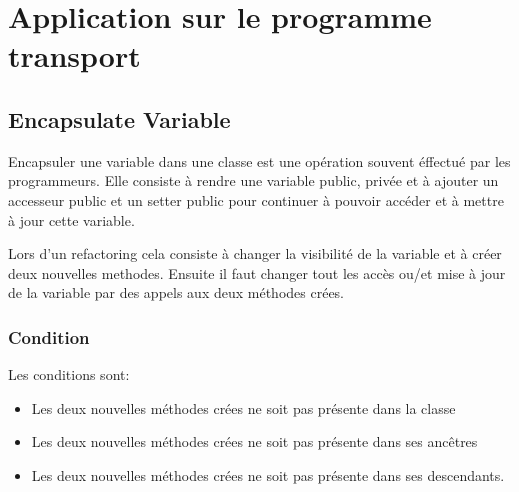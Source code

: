 \documentclass[a4paper, 12pt]{article}
\begin{document}
\section{Application sur le programme transport}

\subsection{Encapsulate Variable}

Encapsuler une variable dans une classe est une opération souvent éffectué par les programmeurs. 
Elle consiste à rendre une variable public, privée et à ajouter un accesseur public et un setter public pour continuer à pouvoir accéder et à mettre à jour cette variable.

Lors d'un refactoring cela consiste à changer la visibilité de la variable et à créer deux nouvelles methodes. Ensuite il faut changer tout les accès ou/et mise à jour de la variable par des appels aux deux méthodes crées.

\subsubsection{Condition}
Les conditions sont:
\begin{itemize}
\item Les deux nouvelles méthodes crées ne soit pas présente dans la classe
\item Les deux nouvelles méthodes crées ne soit pas présente dans ses ancêtres 
\item Les deux nouvelles méthodes crées ne soit pas présente dans ses descendants.
\end{itemize}
\end{document}
